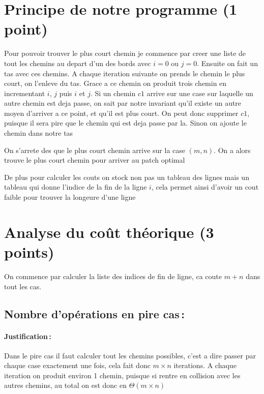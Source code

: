 \documentclass[a4paper,10pt,french]{article}
\begin{document}
\section{Principe de notre  programme (1 point)}
{
	Pour pouvoir trouver le plus court chemin je commence par creer une liste de tout les chemins au depart d'un des bords avec $i=0$ ou $j=0$. Ensuite on fait un tas avec ces chemins. A chaque iteration suivante on prends le chemin le plus court, on l'enleve du tas. Grace a ce chemin on produit trois chemin en incrementant $i$, $j$ puis $i$ et $j$.
	Si un chemin $c1$ arrive sur une case sur laquelle un autre chemin est deja passe, on sait par notre invariant qu'il existe un autre moyen d'arriver a ce point, et qu'il est plus court. On peut donc supprimer $c1$, puisque il sera pire que le chemin qui est deja passe par la.
	Sinon on ajoute le chemin dans notre tas

	On s'arrete des que le plus court chemin arrive sur la case $(m,n)$. On a alors trouve le plus court chemin pour arriver au patch optimal
	
	De plus pour calculer les couts on stock non pas un tableau des lignes mais un tableau qui donne l'indice de la fin de la ligne $i$, cela permet ainsi d'avoir un cout faible pour trouver la longeure d'une ligne
}

\section{Analyse du coût théorique (3 points)}
{
	On commence par calculer la liste des indices de fin de ligne, ca coute $m+n$ dans tout les cas.
}

  \subsection{Nombre  d'opérations en pire cas\,: }
    \paragraph{Justification\,: }
	Dans le pire cas il faut calculer tout les chemins possibles, c'est a dire passer par chaque case exactement une fois, cela fait donc $m\times n$ iterations. A chaque iteration on produit environ 1 chemin, puisque si rentre en collision avec les autres chemins, au total on est donc en $\Theta(m\times n)$
\end{document}
